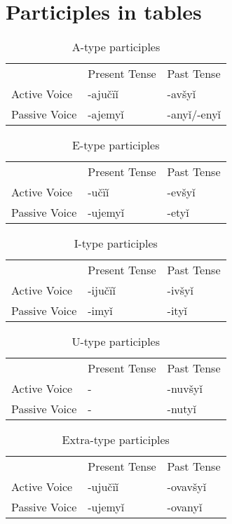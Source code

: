 \section{Participles in tables}

\begin{table}[!htb]
	\caption{A-type participles}
	\begin{tabular}{lll}
		& Present Tense & Past Tense \\
		Active Voice & -ajučïǐ & -avšyǐ \\
		Passive Voice & -ajemyǐ & -anyǐ/-enyǐ
	\end{tabular}
\end{table}

\begin{table}[!htb]
	\caption{E-type participles}
	\begin{tabular}{lll}
		& Present Tense & Past Tense \\
		Active Voice & -učïǐ & -evšyǐ \\
		Passive Voice & -ujemyǐ & -etyǐ
	\end{tabular}
\end{table}

\begin{table}[!htb]
	\caption{I-type participles}
	\begin{tabular}{lll}
		& Present Tense & Past Tense \\
		Active Voice & -ijučïǐ & -ivšyǐ \\
		Passive Voice & -imyǐ & -ityǐ
	\end{tabular}
\end{table}

\begin{table}[!htb]
	\caption{U-type participles}
	\begin{tabular}{lll}
		& Present Tense & Past Tense \\
		Active Voice & - & -nuvšyǐ \\
		Passive Voice & - & -nutyǐ
	\end{tabular}
\end{table}


\begin{table}[!htb]
	\caption{Extra-type participles}
	\begin{tabular}{lll}
		& Present Tense & Past Tense \\
		Active Voice & -ujučïǐ & -ovavšyǐ \\
		Passive Voice & -ujemyǐ & -ovanyǐ
	\end{tabular}
\end{table}
